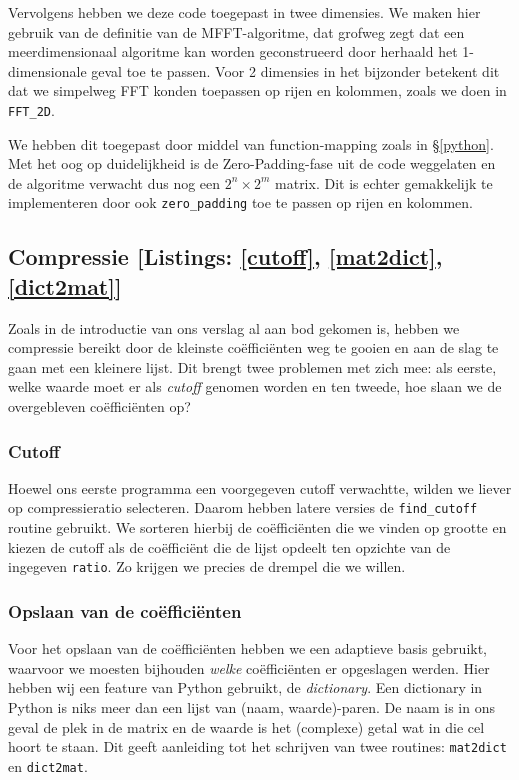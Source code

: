 Vervolgens hebben we deze code toegepast in twee dimensies. We maken hier gebruik van de definitie van de
MFFT-algoritme, dat grofweg zegt dat een meerdimensionaal algoritme kan worden geconstrueerd door herhaald 
het 1-dimensionale geval toe te passen. Voor 2 dimensies in het bijzonder betekent dit dat we simpelweg 
FFT konden toepassen op rijen en kolommen, zoals we doen in \texttt{FFT\_2D}.

We hebben dit toegepast door middel van function-mapping zoals in \S \ref{python}.
Met het oog op duidelijkheid is de Zero-Padding-fase uit de code weggelaten en de algoritme verwacht dus nog een 
$2^n \times 2^m$ matrix. Dit is echter gemakkelijk te implementeren door ook \texttt{zero\_padding} 
toe te passen op rijen en kolommen.

\subsection{Compressie [Listings: \ref{cutoff}, \ref{mat2dict}, \ref{dict2mat}]}
Zoals in de introductie van ons verslag al aan bod gekomen is, hebben we compressie bereikt door de kleinste 
co\"effici\"enten weg te gooien en aan de slag te gaan met een kleinere lijst. 
Dit brengt twee problemen met zich mee: als eerste, welke waarde moet er als \emph{cutoff} genomen worden en ten tweede, 
hoe slaan we de overgebleven co\"effici\"enten op?

\subsubsection{Cutoff}
Hoewel ons eerste programma een voorgegeven cutoff verwachtte, wilden we liever op compressieratio selecteren.
Daarom hebben latere versies de \texttt{find\_cutoff} routine gebruikt. 
We sorteren hierbij de co\"effici\"enten die we vinden op grootte en kiezen de cutoff als de co\"effici\"ent
die de lijst opdeelt ten opzichte van de ingegeven \texttt{ratio}. Zo krijgen we precies de drempel die we willen.

\subsubsection{Opslaan van de co\"effici\"enten}
Voor het opslaan van de co\"effici\"enten hebben we een adaptieve basis gebruikt,
waarvoor we moesten bijhouden \emph{welke} co\"effici\"enten er opgeslagen werden. 
Hier hebben wij een feature van Python gebruikt, de \emph{dictionary}.
Een dictionary in Python is niks meer dan een lijst van (naam, waarde)-paren. 
De naam is in ons geval de plek in de matrix en de waarde is het (complexe) getal wat in die cel hoort te staan. 
Dit geeft aanleiding tot het schrijven van twee routines: \texttt{mat2dict} en \texttt{dict2mat}.

